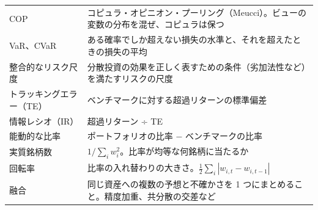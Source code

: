 \begin{longtable}{p{3.6cm}p{10.0cm}}
COP & コピュラ・オピニオン・プーリング（Meucci）。ビューの変数の分布を混ぜ、コピュラは保つ \\
VaR、CVaR & ある確率でしか超えない損失の水準と、それを超えたときの損失の平均 \\
整合的なリスク尺度 & 分散投資の効果を正しく表すための条件（劣加法性など）を満たすリスクの尺度 \\
トラッキングエラー（TE） & ベンチマークに対する超過リターンの標準偏差 \\
情報レシオ（IR） & 超過リターン ÷ TE \\
能動的な比率 & ポートフォリオの比率 − ベンチマークの比率 \\
実質銘柄数 & $1/\sum_iw_i^2$。比率が均等な何銘柄に当たるか \\
回転率 & 比率の入れ替わりの大きさ。$\frac12\sum_i|w_{i,t}-w_{i,t-1}|$ \\
融合 & 同じ資産への複数の予想と不確かさを 1 つにまとめること。精度加重、共分散の交差など \\
\end{longtable}
